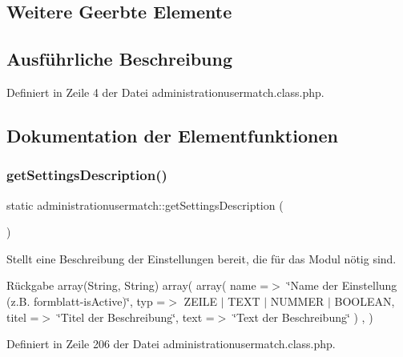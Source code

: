 \subsection*{Weitere Geerbte Elemente}


\subsection{Ausführliche Beschreibung}


Definiert in Zeile 4 der Datei administrationusermatch.\+class.\+php.



\subsection{Dokumentation der Elementfunktionen}
\mbox{\label{classadministrationusermatch_ac7eef5c7cd9d0c03eba65d817d581f9c}} 
\subsubsection{\texorpdfstring{get\+Settings\+Description()}{getSettingsDescription()}}
{\footnotesize\ttfamily static administrationusermatch\+::get\+Settings\+Description (\begin{DoxyParamCaption}{ }\end{DoxyParamCaption})\hspace{0.3cm}{\ttfamily [static]}}

Stellt eine Beschreibung der Einstellungen bereit, die für das Modul nötig sind. \begin{DoxyReturn}{Rückgabe}
array(\+String, String) array( array( \textquotesingle{}name\textquotesingle{} =$>$ \char`\"{}\+Name der Einstellung (z.\+B. formblatt-\/is\+Active)\char`\"{}, \textquotesingle{}typ\textquotesingle{} =$>$ Z\+E\+I\+LE $\vert$ T\+E\+XT $\vert$ N\+U\+M\+M\+ER $\vert$ B\+O\+O\+L\+E\+AN, \textquotesingle{}titel\textquotesingle{} =$>$ \char`\"{}\+Titel der Beschreibung\char`\"{}, \textquotesingle{}text\textquotesingle{} =$>$ \char`\"{}\+Text der Beschreibung\char`\"{} ) , ) 
\end{DoxyReturn}


Definiert in Zeile 206 der Datei administrationusermatch.\+class.\+php.

